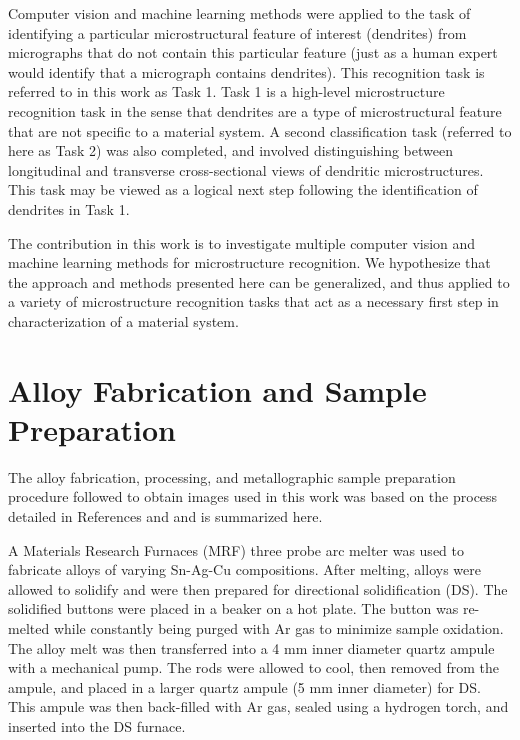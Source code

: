 Computer vision and machine learning methods were applied to the task of identifying a particular microstructural feature of interest (dendrites) from micrographs that do not contain this particular feature (just as a human expert would identify that a micrograph contains dendrites).  This recognition task is referred to in this work as Task 1.  Task 1 is a high-level microstructure recognition task in the sense that dendrites are a type of microstructural feature that are not specific to a material system.  A second classification task (referred to here as Task 2) was also completed, and involved distinguishing between longitudinal and transverse cross-sectional views of dendritic microstructures. This task may be viewed as a logical next step following the identification of dendrites in Task 1.

The contribution in this work is to investigate multiple computer vision and machine learning methods for microstructure recognition. We hypothesize that the approach and methods presented here can be generalized, and thus applied to a variety of microstructure recognition tasks that act as a necessary first step in characterization of a material system.

\section{Alloy Fabrication and Sample Preparation}
\label{sample_prep}

The alloy fabrication, processing, and metallographic sample preparation procedure followed to obtain images used in this work was based on the process detailed in References \cite{Schaefer2005} and \cite{Mao2014} and is summarized here. 
%

A Materials Research Furnaces (MRF) three probe arc melter was used to fabricate alloys of varying Sn-Ag-Cu compositions.  After melting, alloys were allowed to solidify and were then prepared for directional solidification (DS).  The solidified buttons were placed in a beaker on a hot plate.  The button was re-melted while constantly being purged with Ar gas to minimize sample oxidation. The alloy melt was then transferred into a 4 mm inner diameter quartz ampule with a mechanical pump.  The rods were allowed to cool, then removed from the ampule, and placed in a larger quartz ampule (5 mm inner diameter) for DS.  This ampule was then back-filled with Ar gas, sealed using a hydrogen torch, and inserted into the DS furnace.

